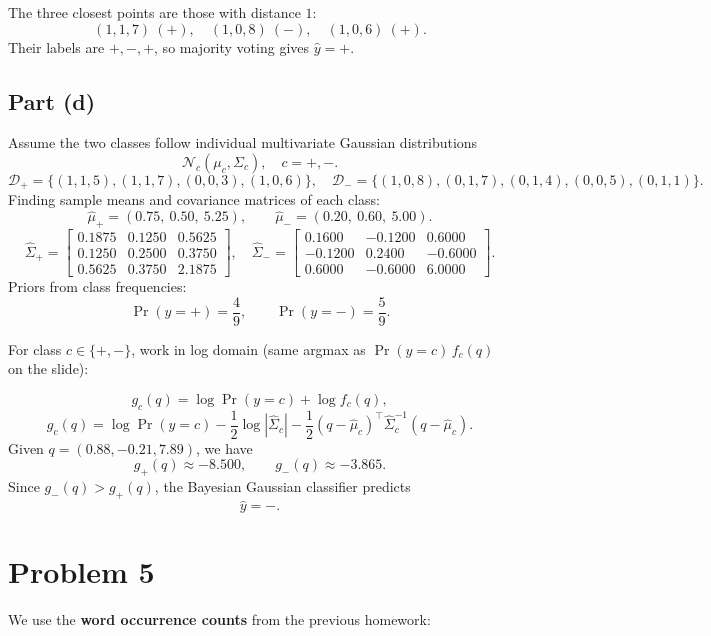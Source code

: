 \documentclass[fleqn]{article}
\begin{document}
    \noindent The three closest points are those with distance $1$:
    \[
        (1,1,7)\ (+),\quad (1,0,8)\ (-),\quad (1,0,6)\ (+).
    \]
    Their labels are $+,-,+$, so majority voting gives $\hat y=+$.


    \subsection{Part (d)}
    Assume the two classes follow individual multivariate Gaussian distributions
    \[
        \mathcal{N}_c(\mu_c,\Sigma_c),\quad c=+,-.
    \]
    \[
        \mathcal{D}_+=\{(1,1,5),(1,1,7),(0,0,3),(1,0,6)\},\quad
        \mathcal{D}_-=\{(1,0,8),(0,1,7),(0,1,4),(0,0,5),(0,1,1)\}.
    \]
    Finding sample means and covariance matrices of each class:
    \[
        \hat\mu_+=\left(0.75,\ 0.50,\ 5.25\right),\qquad
        \hat\mu_-=\left(0.20,\ 0.60,\ 5.00\right).
    \]
    \[
        \hat\Sigma_+=
        \begin{bmatrix}
            0.1875 & 0.1250 & 0.5625\\
            0.1250 & 0.2500 & 0.3750\\
            0.5625 & 0.3750 & 2.1875
        \end{bmatrix},
        \quad
        \hat\Sigma_-=
        \begin{bmatrix}
            0.1600 & -0.1200 & 0.6000\\
            -0.1200 & 0.2400 & -0.6000\\
            0.6000 & -0.6000 & 6.0000
        \end{bmatrix}.
    \]
    Priors from class frequencies:
    \[
        \Pr(y=+)=\frac{4}{9},\qquad \Pr(y=-)=\frac{5}{9}.
    \]

    For class $c\in\{+,-\}$, work in log domain (same argmax as $\Pr(y=c)\,f_c(q)$ on the slide):
    
    \[
        g_c(q)=\log \Pr(y=c)+\log f_c(q),
    \]
    \[
        g_c(q)=\log \Pr(y=c)-\frac{1}{2}\log|\hat\Sigma_c|
        -\frac{1}{2}(q-\hat\mu_c)^\top \hat\Sigma_c^{-1}(q-\hat\mu_c).
    \]
    Given $q=(0.88,-0.21,7.89)$, we have
    \[
        g_+(q)\approx -8.500,\qquad g_-(q)\approx -3.865.
    \]
    Since $g_-(q)>g_+(q)$, the Bayesian Gaussian classifier predicts
    \[
        \hat y=-.
    \]

    \newpage
    \section{Problem 5}
    We use the \textbf{word occurrence counts} from the previous homework:
\end{document}
